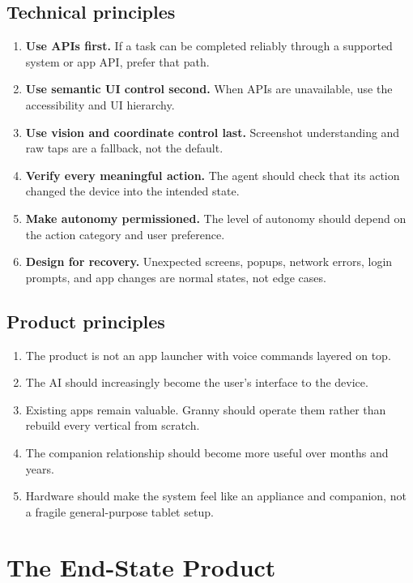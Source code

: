 \documentclass[11pt]{article}
\newcommand{\principle}[2]{\textbf{#1.} #2}
\begin{document}
\subsection{Technical principles}
\begin{enumerate}[leftmargin=*]
    \item \principle{Use APIs first}{If a task can be completed reliably through a supported system or app API, prefer that path.}
    \item \principle{Use semantic UI control second}{When APIs are unavailable, use the accessibility and UI hierarchy.}
    \item \principle{Use vision and coordinate control last}{Screenshot understanding and raw taps are a fallback, not the default.}
    \item \principle{Verify every meaningful action}{The agent should check that its action changed the device into the intended state.}
    \item \principle{Make autonomy permissioned}{The level of autonomy should depend on the action category and user preference.}
    \item \principle{Design for recovery}{Unexpected screens, popups, network errors, login prompts, and app changes are normal states, not edge cases.}
\end{enumerate}

\subsection{Product principles}
\begin{enumerate}[leftmargin=*]
    \item The product is not an app launcher with voice commands layered on top.
    \item The AI should increasingly become the user's interface to the device.
    \item Existing apps remain valuable. Granny should operate them rather than rebuild every vertical from scratch.
    \item The companion relationship should become more useful over months and years.
    \item Hardware should make the system feel like an appliance and companion, not a fragile general-purpose tablet setup.
\end{enumerate}

\section{The End-State Product}
\end{document}
